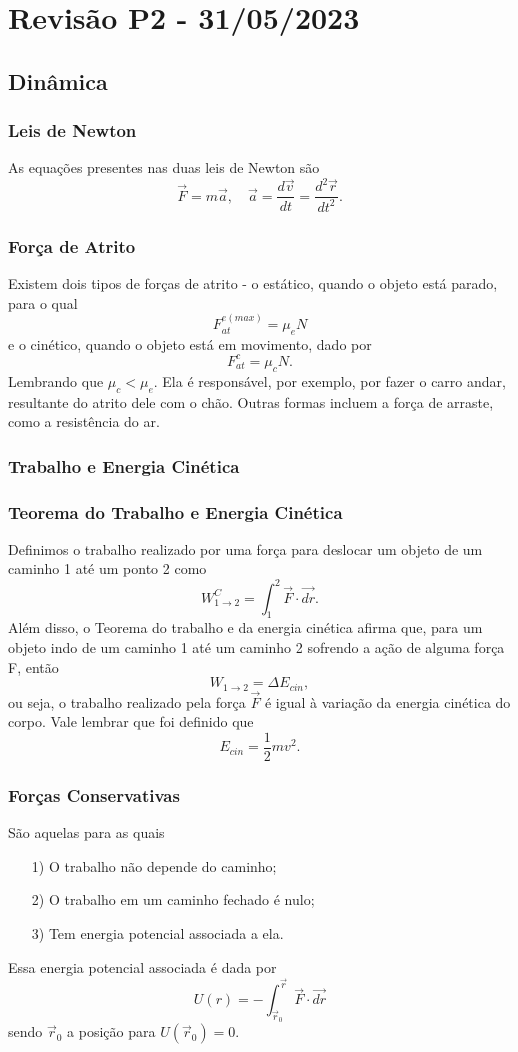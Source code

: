 \documentclass[physics_notes.tex]{subfiles}
\begin{document}
\section{Revisão P2 - 31/05/2023}
\subsection{Dinâmica}
\subsubsection{Leis de Newton}
As equações presentes nas duas leis de Newton são
\[
	\vec{F} = m \vec{a},\quad \vec{a} = \frac{d \vec{v}}{dt}= \frac{d^{2}\vec{r}}{dt^{2}}.
\]
\subsubsection{Força de Atrito}
Existem dois tipos de forças de atrito - o estático, quando o objeto está parado, para o qual
\[
	F_{at}^{e(max)} = \mu_{e}N
\]
e o cinético, quando o objeto está em movimento, dado por
\[
	F_{at}^{c} = \mu_{c}N.
\]
Lembrando que \(\mu_{c} < \mu_{e}\). Ela é responsável, por exemplo, por fazer
o carro andar, resultante do atrito dele com o chão. Outras formas incluem a força de
arraste, como a resistência do ar.

\subsubsection{Trabalho e Energia Cinética}
\subsubsection{Teorema do Trabalho e Energia Cinética}
Definimos o trabalho realizado por uma força para deslocar um objeto de um caminho 1 até
um ponto 2 como
\[
	W_{1\rightarrow2}^{C} = \int_{1}^{2}\vec{F}\cdot \vec{dr}.
\]
Além disso, o Teorema do trabalho e da energia cinética afirma que, para um objeto indo de um
caminho 1 até um caminho 2 sofrendo a ação de alguma força F, então
\[
	W_{1\rightarrow2} = \Delta E_{cin},
\]
ou seja, o trabalho realizado pela força \(\vec{F}\) é igual à variação
da energia cinética do corpo. Vale lembrar que foi definido que
\[
	E_{cin}=\frac{1}{2}mv^{2}.
\]
\subsubsection{Forças Conservativas}
São aquelas para as quais
\begin{itemize}
	\item[1)] O trabalho não depende do caminho;
	\item[2)] O trabalho em um caminho fechado é nulo;
	\item[3)] Tem energia potencial associada a ela.
\end{itemize}
Essa energia potencial associada é dada por
\[
	U(r) = -\int_{\vec{r}_{0}}^{\vec{r}}\vec{F}\cdot \vec{dr}
\]
sendo \(\vec{r}_{0}\) a posição para \(U(\vec{r}_{0}) = 0.\)
\end{document}
